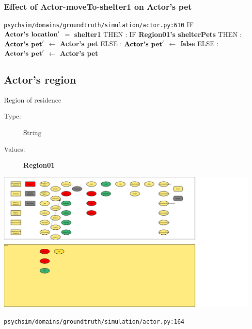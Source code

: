 \documentclass{article}%
\begin{document}
\subsubsection{Effect of Actor{-}moveTo{-}shelter1 on Actor's pet}%
\label{ssubsec:Effect of Actor{-}moveTo{-}shelter1 on Actor's pet}%
\begin{flushleft}%
\verb|psychsim/domains/groundtruth/simulation/actor.py:610|%
\linebreak%
IF %
$\mbox{\textbf{Actor's location}} '$%
$=$%
\textbf{shelter1}%
\linebreak%
\hspace*{2em}%
THEN %
: %
IF %
\textbf{Region01's shelterPets}%
\linebreak%
\hspace*{4em}%
THEN %
: %
$\mbox{\textbf{Actor's pet}} '$%
$\leftarrow$%
\textbf{Actor's pet}%
\linebreak%
\hspace*{4em}%
ELSE %
: %
$\mbox{\textbf{Actor's pet}} '$%
$\leftarrow$%
\textbf{false}%
\linebreak%
\hspace*{2em}%
ELSE %
: %
$\mbox{\textbf{Actor's pet}} '$%
$\leftarrow$%
\textbf{Actor's pet}%
\end{flushleft}

%
\subsection{Actor's region}%
\label{subsec:Actor's region}%
Region of residence%
\begin{description}%
\item[Type:]%
String%
\item[Values:]%
\textbf{Region01}%
\end{description}%
\includegraphics[width=\textwidth]{images/regionOfActor.png}%
\begin{flushleft}%
\verb|psychsim/domains/groundtruth/simulation/actor.py:164|%
\end{flushleft}
\end{document}
